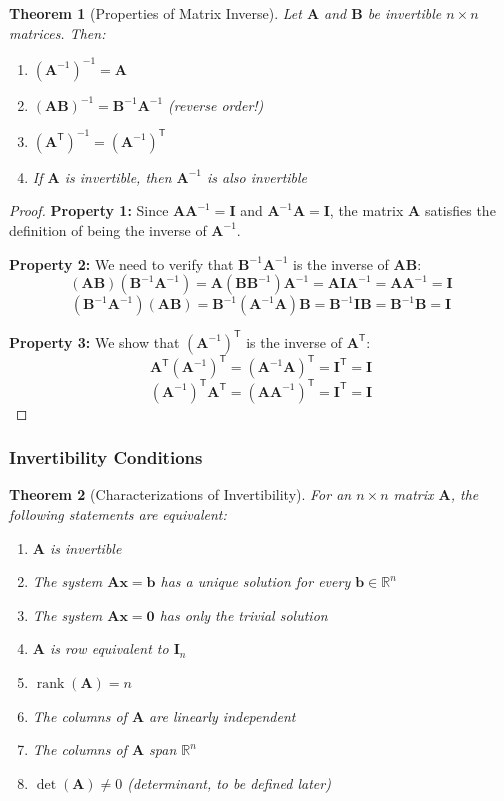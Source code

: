 \documentclass[12pt]{article}
\numberwithin{equation}{section}
\newcommand{\RR}{\mathbb{R}}
\newcommand{\vect}[1]{\boldsymbol{#1}}   %
\newcommand{\mat}[1]{\mathbf{#1}}        %
\newcommand{\trans}{\mathsf{T}}          %
\newcommand{\rank}{\operatorname{rank}}
\theoremstyle{plain}
\newtheorem{theorem}{Theorem}[section]
\theoremstyle{definition}
\theoremstyle{remark}
\begin{document}
\begin{theorem}[Properties of Matrix Inverse]
Let $\mat{A}$ and $\mat{B}$ be invertible $n \times n$ matrices. Then:
\begin{enumerate}
\item $(\mat{A}^{-1})^{-1} = \mat{A}$
\item $(\mat{A}\mat{B})^{-1} = \mat{B}^{-1}\mat{A}^{-1}$ (reverse order!)
\item $(\mat{A}^{\trans})^{-1} = (\mat{A}^{-1})^{\trans}$
\item If $\mat{A}$ is invertible, then $\mat{A}^{-1}$ is also invertible
\end{enumerate}
\end{theorem}

\begin{proof}
\textbf{Property 1:} Since $\mat{A}\mat{A}^{-1} = \mat{I}$ and $\mat{A}^{-1}\mat{A} = \mat{I}$, the matrix $\mat{A}$ satisfies the definition of being the inverse of $\mat{A}^{-1}$.

\textbf{Property 2:} We need to verify that $\mat{B}^{-1}\mat{A}^{-1}$ is the inverse of $\mat{A}\mat{B}$:
$$(\mat{A}\mat{B})(\mat{B}^{-1}\mat{A}^{-1}) = \mat{A}(\mat{B}\mat{B}^{-1})\mat{A}^{-1} = \mat{A}\mat{I}\mat{A}^{-1} = \mat{A}\mat{A}^{-1} = \mat{I}$$
$$(\mat{B}^{-1}\mat{A}^{-1})(\mat{A}\mat{B}) = \mat{B}^{-1}(\mat{A}^{-1}\mat{A})\mat{B} = \mat{B}^{-1}\mat{I}\mat{B} = \mat{B}^{-1}\mat{B} = \mat{I}$$

\textbf{Property 3:} We show that $(\mat{A}^{-1})^{\trans}$ is the inverse of $\mat{A}^{\trans}$:
$$\mat{A}^{\trans}(\mat{A}^{-1})^{\trans} = (\mat{A}^{-1}\mat{A})^{\trans} = \mat{I}^{\trans} = \mat{I}$$
$$(\mat{A}^{-1})^{\trans}\mat{A}^{\trans} = (\mat{A}\mat{A}^{-1})^{\trans} = \mat{I}^{\trans} = \mat{I}$$
\end{proof}

\subsubsection{Invertibility Conditions}

\begin{theorem}[Characterizations of Invertibility]
For an $n \times n$ matrix $\mat{A}$, the following statements are equivalent:
\begin{enumerate}
\item $\mat{A}$ is invertible
\item The system $\mat{A}\vect{x} = \vect{b}$ has a unique solution for every $\vect{b} \in \RR^n$
\item The system $\mat{A}\vect{x} = \vect{0}$ has only the trivial solution
\item $\mat{A}$ is row equivalent to $\mat{I}_n$
\item $\rank(\mat{A}) = n$
\item The columns of $\mat{A}$ are linearly independent
\item The columns of $\mat{A}$ span $\RR^n$
\item $\det(\mat{A}) \neq 0$ (determinant, to be defined later)
\end{enumerate}
\end{theorem}
\end{document}
